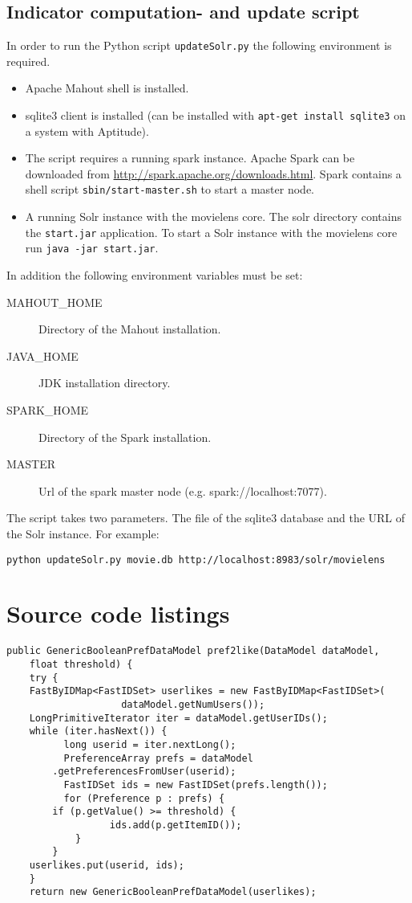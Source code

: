\subsection{Indicator computation- and update script}
In order to run the Python script \verb|updateSolr.py| the following environment is required.
\begin{itemize}
\item Apache Mahout shell is installed.
\item sqlite3 client is installed (can be installed with \verb|apt-get install sqlite3| on a system with Aptitude). 
\item The script requires a running spark instance. Apache Spark can be downloaded from \url{http://spark.apache.org/downloads.html}. Spark contains a shell script \verb|sbin/start-master.sh| to start a master node.
\item A running Solr instance with the movielens core. The solr directory contains the \verb|start.jar| application. To start a Solr instance with the movielens core run \verb|java -jar start.jar|.
\end{itemize}

In addition the following environment variables must be set:
\begin{description}
\item[MAHOUT\_HOME] Directory of the Mahout installation.
\item[JAVA\_HOME] JDK installation directory.
\item[SPARK\_HOME] Directory of the Spark installation.
\item[MASTER] Url of the spark master node (e.g. spark://localhost:7077).
\end{description}

The script takes two parameters. The file of the sqlite3 database and the URL of the Solr instance. For example:
\begin{verbatim}
python updateSolr.py movie.db http://localhost:8983/solr/movielens
\end{verbatim}

\section{Source code listings}
\label{sec:listings}

\begin{lstlisting}[caption={To simulate the user action ``like'' we extract all ratings equal or above a score of 4.0 and use the result as training set},label={lst:pref2like}]
 public GenericBooleanPrefDataModel pref2like(DataModel dataModel,
	float threshold) {
	try {
	FastByIDMap<FastIDSet> userlikes = new FastByIDMap<FastIDSet>(
					dataModel.getNumUsers());
	LongPrimitiveIterator iter = dataModel.getUserIDs();
	while (iter.hasNext()) {
          long userid = iter.nextLong();
          PreferenceArray prefs = dataModel
		.getPreferencesFromUser(userid);
          FastIDSet ids = new FastIDSet(prefs.length());
          for (Preference p : prefs) {
		if (p.getValue() >= threshold) {
                  ids.add(p.getItemID());
			}
		}
	userlikes.put(userid, ids);
	}
    return new GenericBooleanPrefDataModel(userlikes);
\end{lstlisting}


